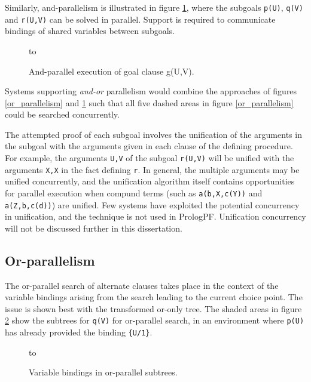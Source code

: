 Similarly, and-parallelism is illustrated in figure \ref{and_parallelism}, where
the subgoals \texttt{p(U)}, \texttt{q(V)} and \texttt{r(U,V)} can be solved in
parallel.  Support is required to communicate bindings of shared variables
between subgoals.

\begin{figure}[h]
\vspace{5mm} \hbox to 
\caption{And-parallel execution of goal clause g(U,V).}
\vspace{5mm}
\label{and_parallelism}
\end{figure}

Systems supporting \textit{and-or} parallelism would combine the approaches of
figures \ref{or_parallelism} and \ref{and_parallelism} such that all five
dashed areas in figure \ref{or_parallelism} could be searched concurrently.

The attempted proof of each subgoal involves the unification of the arguments
in the subgoal with the arguments given in each clause of the defining
procedure. For example, the arguments \texttt{U,V} of the subgoal \texttt{r(U,V)}
will be unified with the arguments \texttt{X,X} in the fact defining \texttt{r}.
In general, the multiple arguments may be unified concurrently, and the
unification algorithm itself contains opportunities for parallel execution when
compund terms (such as \texttt{a(b,X,c(Y))} and \texttt{a(Z,b,c(d))}) are
unified.  Few systems have exploited the potential concurrency in unification,
and the technique is not used in PrologPF.  Unification concurrency will not be
discussed further in this dissertation.

\subsection{Or-parallelism}

The or-parallel search of alternate clauses takes place in the context of
the variable bindings arising from the search leading to the current choice point.
The issue is shown best with the transformed or-only tree. 
The shaded areas in figure \ref{or_context}
show the subtrees for \texttt{q(V)} for or-parallel search, in an environment
where \texttt{p(U)} has already provided the binding \texttt{\{U/1\}}.

\begin{figure}[h]
\vspace{5mm} \hbox to 
\caption{Variable bindings in or-parallel subtrees.}
\vspace{5mm}
\label{or_context}
\end{figure}


